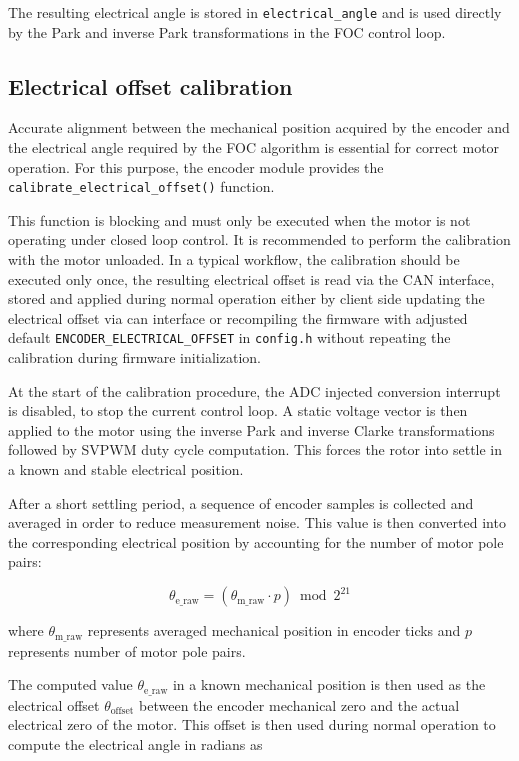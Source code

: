 The resulting electrical angle is stored in \texttt{electrical\_angle} and is used directly by the Park and inverse Park transformations in the FOC control loop.

\subsection{Electrical offset calibration}
Accurate alignment between the mechanical position acquired by the encoder and the electrical angle
required by the FOC algorithm is essential for correct motor operation. 
For this purpose, the encoder module provides the \texttt{calibrate\_electrical\_offset()} function.

This function is blocking and must only be executed when the motor is not operating under closed loop control.
It is recommended to perform the calibration with the motor unloaded.
In a typical workflow, the calibration should be executed only once, the resulting electrical offset is read via the CAN interface, 
stored and applied during normal operation either by client side updating the electrical offset via can interface or recompiling the firmware with
adjusted default \texttt{ENCODER\_ELECTRICAL\_OFFSET} in \texttt{config.h} without repeating the calibration during firmware initialization.

At the start of the calibration procedure, the ADC injected conversion interrupt is disabled, to stop the current control loop. 
A static voltage vector is then applied to the motor using the inverse Park and inverse Clarke transformations followed by SVPWM duty cycle computation. 
This forces the rotor into settle in a known and stable electrical position.

After a short settling period, a sequence of encoder samples is collected and averaged in order to reduce measurement noise. 
This value is then converted into the corresponding electrical position by accounting for the number of motor pole pairs:

\begin{equation}
    \theta_{\text{e\_raw}} = \left( \theta_{\text{m\_raw}} \cdot p \right) \bmod 2^{21}
\end{equation}

where $\theta_{\text{m\_raw}}$ represents averaged mechanical position in encoder ticks and $p$ represents number of motor pole pairs.

The computed value $\theta_{\text{e\_raw}}$ in a known mechanical position is then used as 
the electrical offset $\theta_{\text{offset}}$ between the encoder mechanical zero and the actual electrical zero of the motor.
\newpage
This offset is then used during normal operation to compute the electrical angle in radians as

